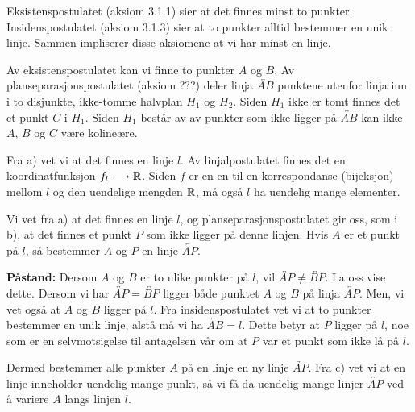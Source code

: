 \begin{oppgave}[3.7.2]
\begin{punkt}
    Eksistenspostulatet (aksiom 3.1.1) sier at det finnes minst to punkter. 
    Insidenspostulatet (aksiom 3.1.3) sier at to punkter alltid bestemmer en unik linje. 
    Sammen impliserer disse aksiomene at vi har minst en linje. 
\end{punkt}

\begin{punkt}
    Av eksistenspostulatet kan vi finne to punkter $A$ og $B$. 
    Av planseparasjonspostulatet (aksiom ???) deler linja $\overleftrightarrow{AB}$ punktene utenfor linja inn i to disjunkte, ikke-tomme halvplan $H_1$ og $H_2$.
    Siden $H_1$ ikke er tomt finnes det et punkt $C$ i $H_1$. 
    Siden $H_1$ består av av punkter som ikke ligger på $\overleftrightarrow{AB}$ kan ikke $A$, $B$ og $C$ være kolineære.
\end{punkt}

\begin{punkt}
    Fra a) vet vi at det finnes en linje $l$. 
    Av linjalpostulatet finnes det en koordinatfunksjon $f_l\longrightarrow \mathbb{R}$. 
    Siden $f$ er en en-til-en-korrespondanse (bijeksjon) mellom $l$ og den uendelige mengden $\mathbb{R}$, må også $l$ ha uendelig mange elementer.
\end{punkt}

\begin{punkt}
    Vi vet fra a) at det finnes en linje $l$, og planseparasjonspostulatet gir oss, som i b), at det finnes et punkt $P$ som ikke ligger på denne linjen.
    Hvis $A$ er et punkt på $l$, så bestemmer $A$ og $P$ en linje $\overleftrightarrow{AP}$. 
    
    \textbf{Påstand:} Dersom $A$ og $B$ er to ulike punkter på $l$, vil $\overleftrightarrow{AP}\neq \overleftrightarrow{BP}$. 
    La oss vise dette. 
    Dersom vi har $\overleftrightarrow{AP} = \overleftrightarrow{BP}$ ligger både punktet $A$ og $B$ på linja $\overleftrightarrow{AP}$. 
    Men, vi vet også at $A$ og $B$ ligger på $l$. 
    Fra insidenspostulatet vet vi at to punkter bestemmer en unik linje, alstå må vi ha $\overleftrightarrow{AB}=l$. 
    Dette betyr at $P$ ligger på $l$, noe som er en selvmotsigelse til antagelsen vår om at $P$ var et punkt som ikke lå på $l$. 

    Dermed bestemmer alle punkter $A$ på en linje en ny linje $\overleftrightarrow{AP}$.
    Fra c) vet vi at en linje inneholder uendelig mange punkt, så vi få da uendelig mange linjer $\overleftrightarrow{AP}$ ved å variere $A$ langs linjen $l$.
\end{punkt}


\end{oppgave}
